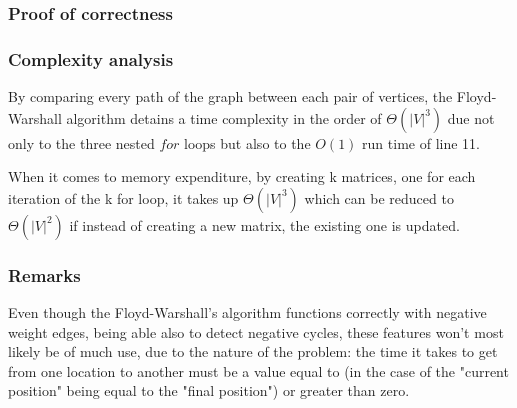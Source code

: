 \subsubsection{Proof of correctness}

\subsubsection{Complexity analysis}
By comparing every path of the graph between each pair of vertices, the Floyd-Warshall algorithm detains a time complexity in the order of $\Theta(|V|^3)$ due not only to the three nested $for$ loops but also to the $O(1)$ run time of line 11.\par
When it comes to memory expenditure, by creating k matrices, one for each iteration of the k for loop, it takes up $\Theta(|V|^3)$ which can be reduced to $\Theta(|V|^2)$ if instead of creating a new matrix, the existing one is updated.

\subsubsection{Remarks}
Even though the Floyd-Warshall's algorithm functions correctly with negative weight edges, being able also to detect negative cycles, these features won't most likely be of much use, due to the nature of the problem:
the time it takes to get from one location to another must be a value equal to (in the case of the "current position" being equal to the "final position") or greater than zero.